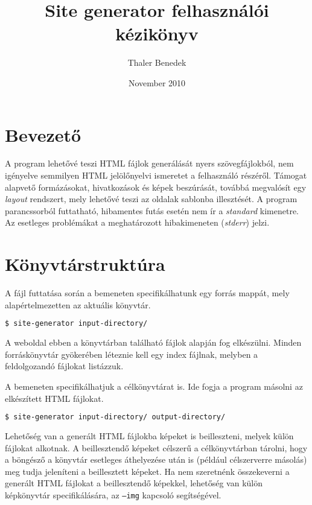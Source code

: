 \documentclass[a4paper,10pt]{article}
\title{Site generator felhasználói kézikönyv}
\author{Thaler Benedek}
\date{November 2010}
\begin{document}
\maketitle
\tableofcontents

\section{Bevezető}
A program lehetővé teszi HTML fájlok generálását nyers szövegfájlokból, nem igényelve semmilyen HTML jelölőnyelvi ismeretet a felhasználó részéről. Támogat alapvető formázásokat, hivatkozások és képek beszúrását, továbbá megvalósít egy \emph{layout} rendszert, mely lehetővé teszi az oldalak sablonba illesztését.
A program parancssorból futtatható, hibamentes futás esetén nem ír a \emph{standard} kimenetre. Az esetleges problémákat a meghatározott hibakimeneten (\emph{stderr}) jelzi.

\section{Könyvtárstruktúra}
A fájl futtatása során a bemeneten specifikálhatunk egy forrás mappát, mely alapértelmezetten az aktuális könyvtár. 

\begin{lstlisting}[language=bash]
$ site-generator input-directory/
\end{lstlisting}

A weboldal ebben a könyvtárban található fájlok alapján fog elkészülni. Minden forráskönyvtár gyökerében léteznie kell egy index fájlnak, melyben a feldolgozandó fájlokat listázzuk.

A bemeneten specifikálhatjuk a célkönyvtárat is. Ide fogja a program másolni az elkészített HTML fájlokat.

\begin{lstlisting}[language=bash]
$ site-generator input-directory/ output-directory/
\end{lstlisting}

Lehetőség van a generált HTML fájlokba képeket is beilleszteni, melyek külön fájlokat alkotnak. A beillesztendő képeket célszerű a célkönyvtárban tárolni, hogy a böngésző a könyvtár esetleges áthelyezése után is (például célszerverre másolás) meg tudja jeleníteni a beillesztett képeket.
Ha nem szeretnénk összekeverni a generált HTML fájlokat a beillesztendő képekkel, lehetőség van külön képkönyvtár specifikálására, az \texttt{--img} kapcsoló segítségével.
\end{document}
